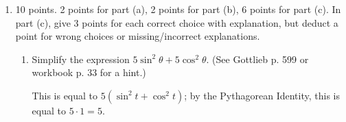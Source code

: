 \documentclass{article}
\begin{document}
\begin{enumerate}
\begin{enumerate}
    \item 
    \begin{problem}
        Write down the two solutions to $\sin\theta = \frac{\sqrt{3}}{2}$ on the interval $[-2\pi, 0)$.
    \end{problem}

    \begin{solution}
        $\theta=\frac{\pi}{3}-2\pi$ and $\theta=\frac{2\pi}{3}-2\pi$.
    \end{solution}

    \item 
    \begin{problem}
        Let $n$ be a variable that can take on the value of any integer ($\ldots, -2, -1, 0, 1, 2, \ldots$). Using $n$, write down two formulas that can represent all of the possible solutions to $\sin\theta = \frac{\sqrt{3}}{2}$.
    \end{problem}
    \pspace{\vfill}

    \begin{solution}
        The solutions to $\sin\theta=\frac{\sqrt{3}}{2}$ are exactly the angles that are coterminal to either $\theta=\frac{\pi}{3}$ or $\theta=\frac{2\pi}{3}$. We can express these as $\theta = \frac{\pi}{3} + 2\pi n$ and $\theta = \frac{2\pi}{3} + 2\pi n$.
    \end{solution}
    
\end{enumerate}

\pspace{\newpage}



\item 

\begin{grading}
10 points. 2 points for part (a), 2 points for part (b), 6 points for part (c). In part (c), give 3 points for each correct choice with explanation, but deduct a point for wrong choices or missing/incorrect explanations. 
\end{grading}

  \begin{enumerate}[topsep=0pt]
  \item
    \begin{problem}[\stretch{1}]
      Simplify the expression $5\sin^2 \theta + 5 \cos^2 \theta$. (See Gottlieb p. 599 or workbook p. 33 for a hint.) 
    \end{problem}

    \begin{solution}
      This is equal to $5 (\sin^2 t + \cos^2 t)$; by the Pythagorean
      Identity, this is equal to $5 \cdot 1 = \boxed{5}$. 
    \end{solution}


\end{enumerate}
\end{enumerate}
\end{document}
